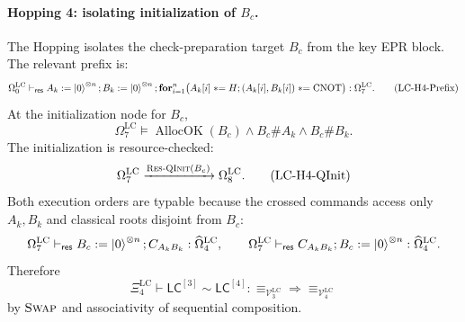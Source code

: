 \documentclass{report}
\theoremstyle{defn_style}
\newcommand{\asteq}{\mathrel{*}=}
\providecommand{\AllocOK}{\operatorname{AllocOK}}
\providecommand{\HopLC}[1]{\mathsf{LC}^{[#1]}}
\begin{document}
\paragraph{Hopping 4: isolating initialization of \(B_c\).}
The Hopping isolates the check-preparation target \(B_c\) from the key EPR
block.  The relevant prefix is:
\[
\Omega^{\mathrm{LC}}_0
\vdash_{\mathsf{res}}
A_k:=\ket0^{\otimes n};
B_k:=\ket0^{\otimes n};
\mathbf{for}_{i=1}^n
\bigl(
  A_k[i]\asteq H;
  (A_k[i],B_k[i])\asteq\mathrm{CNOT}
\bigr)
:
\Omega^{\mathrm{LC}}_7.
\tag{LC-H4-Prefix}\label{LC-H4-Prefix}
\]
At the initialization node for \(B_c\),
\[
\Omega^{\mathrm{LC}}_7
\models
\AllocOK(B_c)
\land
B_c\#A_k
\land
B_c\#B_k.
\tag{LC-H4-SwapReq}
\]
The initialization is resource-checked:
\[
\Omega^{\mathrm{LC}}_7
\xrightarrow{\textsc{Res-QInit}(B_c)}
\Omega^{\mathrm{LC}}_8.
\tag{LC-H4-QInit}
\]
Both execution orders are typable because the crossed commands access only
\(A_k,B_k\) and classical roots disjoint from \(B_c\):
\[
\Omega^{\mathrm{LC}}_7
\vdash_{\mathsf{res}}
B_c:=\ket0^{\otimes n};C_{A_kB_k}:\widehat\Omega^{\mathrm{LC}}_4,
\qquad
\Omega^{\mathrm{LC}}_7
\vdash_{\mathsf{res}}
C_{A_kB_k};B_c:=\ket0^{\otimes n}:\widehat\Omega^{\mathrm{LC}}_4 .
\]
Therefore
\[
\Xi^{\mathrm{LC}}_4
\vdash
\HopLC{3}\sim\HopLC{4}:
\equiv_{\mathcal V^{\mathrm{LC}}_3}
\Longrightarrow
\equiv_{\mathcal V^{\mathrm{LC}}_4}
\tag{LC-H4-Rel}
\]
by \(\textsc{Swap}\) and associativity of sequential composition.
\end{document}
